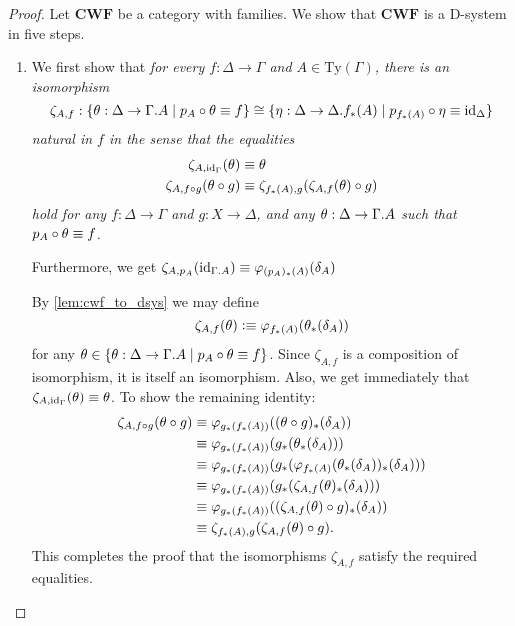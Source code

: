 \begin{proof}
Let $\mathbf{CWF}$ be a category with families. We show that $\mathbf{CWF}$ is
a D-system in five steps.
\begin{enumerate}
\item We first show that
\begingroup\it for every $f:\Delta\to\Gamma$ and $A\in\mathrm{Ty}(\Gamma)$, there is an
isomorphism
\begin{equation*}
\zeta_{A,f}:\{\theta:\Delta\to\ctxext{\Gamma}{A}\mid p_A\circ\theta\jdeq f\}
  \cong
\{\eta:\Delta\to\ctxext{\Delta}{f_\ast(A)}\mid p_{f_\ast(A)}\circ\eta\jdeq\catid{\Delta}\}
\end{equation*}
natural in $f$ in the sense that the equalities
\begin{align*}
\zeta_{A,{\mathrm{id}_{\Gamma}}}(\theta) & \equiv \theta \\
\zeta_{A,f\circ g}(\theta\circ g) & \equiv \zeta_{f_\ast(A),g}(\zeta_{A,f}(\theta)\circ g)
\end{align*}
hold for any $f:\Delta\to\Gamma$ and $g:X\to\Delta$, and any $\theta:\Delta\to\ctxext{\Gamma}{A}$
such that $p_A\circ\theta\equiv f$.

Furthermore, we get $\zeta_{A,p_A}(\catid{\ctxext{\Gamma}{A}})\jdeq\varphi_{(p_A)_\ast(A)}(\delta_A)$%
\endgroup
\medskip

\renewcommand\qedsymbol{\(\blacksquare\)}
By \autoref{lem:cwf_to_dsys} we may define
\begin{equation*}
\zeta_{A,f}(\theta)\vcentcolon\equiv \varphi_{f_\ast(A)}(\theta_\ast(\delta_A))
\end{equation*}
for any $\theta\in\{\theta:\Delta\to\ctxext{\Gamma}{A}\mid p_A\circ\theta\jdeq f\}$. 
Since $\zeta_{A,f}$ is a composition of isomorphism, it is itself an isomorphism.
Also, we get immediately that $\zeta_{A,{\mathrm{id}_{\Gamma}}}(\theta)\equiv\theta$. To
show the remaining identity:
\begin{align*}
\zeta_{A,f\circ g}(\theta\circ g)
& \equiv \varphi_{g_\ast(f_\ast(A))}((\theta\circ g)_\ast(\delta_A)) \\
& \equiv \varphi_{g_\ast(f_\ast(A))}(g_\ast(\theta_\ast(\delta_A))) \\
& \equiv \varphi_{g_\ast(f_\ast(A))}(g_\ast(\varphi_{f_\ast(A)}(\theta_\ast(\delta_A))_\ast(\delta_A))) \\
& \equiv \varphi_{g_\ast(f_\ast(A))}(g_\ast(\zeta_{A,f}(\theta)_\ast(\delta_A))) \\
& \equiv \varphi_{g_\ast(f_\ast(A))}((\zeta_{A,f}(\theta)\circ g)_\ast(\delta_A)) \\
& \equiv \zeta_{f_\ast(A),g}(\zeta_{A,f}(\theta)\circ g).
\end{align*}
This completes the proof that the isomorphisms $\zeta_{A,f}$ satisfy the required
equalities.


\end{enumerate}
\end{proof}
